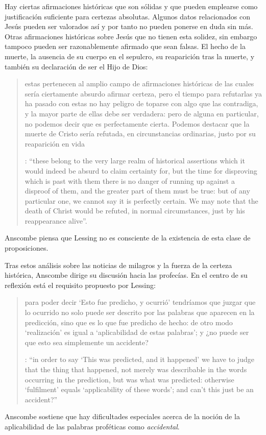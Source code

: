 Hay ciertas afirmaciones históricas que son sólidas y que pueden emplearse como justificación suficiente para certezas absolutas. Algunos datos relacionados con Jesús pueden ser valorados así y por tanto no pueden ponerse en duda sin más. Otras afirmaciones históricas sobre Jesús que no tienen esta solidez, sin embargo tampoco pueden ser razonablemente afirmado que sean falsas. El hecho de la muerte, la ausencia de su cuerpo en el sepulcro, su reaparición tras la muerte, y también su declaración de ser el Hijo de Dios: \blockquote[{\Cite[28]{anscombe2008faith:prophandmi}}: \enquote{these belong to the very large realm of historical assertions which it would indeed be absurd to claim certainty for, but the time for disproving which is past \textelp{} with them there is no danger of running up against a disproof of them, and the greater part of them must be true: but of any particular one, we cannot say it is perfectly certain. We may note that the death of Christ would be refuted, in normal circumstances, just by his reappearance alive}.]{estas pertenecen al amplio campo de afirmaciones históricas de las cuales sería ciertamente absurdo afirmar certeza, pero el tiempo para refutarlas ya ha pasado \textelp{} con estas no hay peligro de toparse con algo que las contradiga, y la mayor parte de ellas debe ser verdadera: pero de alguna en particular, no podemos decir que es perfectamente cierta. Podemos destacar que la muerte de Cristo sería refutada, en circunstancias ordinarias, justo por su reaparición en vida}. Anscombe piensa que Lessing no es consciente de la existencia de esta clase de proposiciones.

Tras estos análisis sobre las noticias de milagros y la fuerza de la certeza histórica, Anscombe dirige su discusión hacia las profecías. En el centro de su reflexión está el requisito propuesto por Lessing: \blockquote[{\Cite[29]{anscombe2008faith:prophandmi}}: \enquote{in order to say `This was predicted, and it happened' we have to judge that the thing that happened, not merely was describable in the words occurring in the prediction, but was what was predicted: otherwise `fulfilment' equals `applicability of these words'; and can't this just be an accident?}]{para poder decir `Esto fue predicho, y ocurrió' tendríamos que juzgar que lo ocurrido no solo puede ser descrito por las palabras que aparecen en la predicción, sino que es lo que fue predicho de hecho: de otro modo `realización' es igual a `aplicabilidad de estas palabras'; y ¿no puede ser que esto sea simplemente un accidente?} Anscombe sostiene que hay dificultades especiales acerca de la noción de la aplicabilidad de las palabras proféticas como \emph{accidental}.

